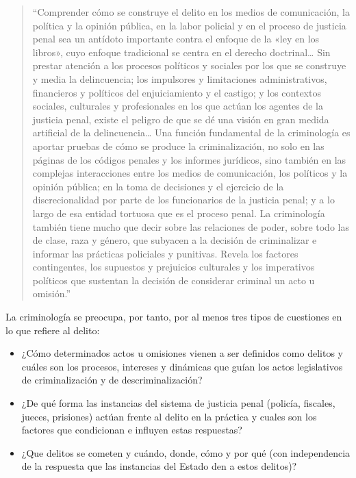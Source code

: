 \documentclass[
  spanish,
  letterpaper,
  DIV=11,
  numbers=noendperiod]{scrreprt}
\begin{document}
\begin{quote}
``Comprender cómo se construye el delito en los medios de comunicación,
la política y la opinión pública, en la labor policial y en el proceso
de justicia penal sea un antídoto importante contra el enfoque de la
«ley en los libros», cuyo enfoque tradicional se centra en el derecho
doctrinal\ldots{} Sin prestar atención a los procesos políticos y
sociales por los que se construye y media la delincuencia; los
impulsores y limitaciones administrativos, financieros y políticos del
enjuiciamiento y el castigo; y los contextos sociales, culturales y
profesionales en los que actúan los agentes de la justicia penal, existe
el peligro de que se dé una visión en gran medida artificial de la
delincuencia\ldots{} Una función fundamental de la criminología es
aportar pruebas de cómo se produce la criminalización, no solo en las
páginas de los códigos penales y los informes jurídicos, sino también en
las complejas interacciones entre los medios de comunicación, los
políticos y la opinión pública; en la toma de decisiones y el ejercicio
de la discrecionalidad por parte de los funcionarios de la justicia
penal; y a lo largo de esa entidad tortuosa que es el proceso penal. La
criminología también tiene mucho que decir sobre las relaciones de
poder, sobre todo las de clase, raza y género, que subyacen a la
decisión de criminalizar e informar las prácticas policiales y
punitivas. Revela los factores contingentes, los supuestos y prejuicios
culturales y los imperativos políticos que sustentan la decisión de
considerar criminal un acto u omisión.''
\end{quote}

La criminología se preocupa, por tanto, por al menos tres tipos de
cuestiones en lo que refiere al delito:

\begin{itemize}
\item
  ¿Cómo determinados actos u omisiones vienen a ser definidos como
  delitos y cuáles son los procesos, intereses y dinámicas que guían los
  actos legislativos de criminalización y de descriminalización?
\item
  ¿De qué forma las instancias del sistema de justicia penal (policía,
  fiscales, jueces, prisiones) actúan frente al delito en la práctica y
  cuales son los factores que condicionan e influyen estas respuestas?
\item
  ¿Que delitos se cometen y cuándo, donde, cómo y por qué (con
  independencia de la respuesta que las instancias del Estado den a
  estos delitos)?
\end{itemize}
\end{document}
